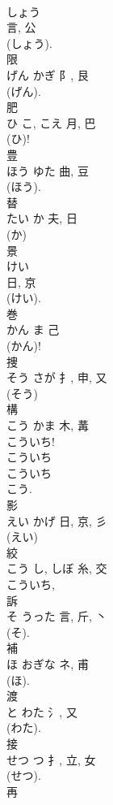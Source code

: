 \documentclass[8pt]{extreport}
\begin{document}
\begin{CJK}{UTF8}{min}
\\	しょう	
\\	言, 公	
\\	(しょう). 
\\	限	
\\	げん	かぎ	阝, 艮	
\\	(げん). 
\\	肥	
\\	ひ	こ, こえ	月, 巴	
\\	(ひ)! 
\\	豊	
\\	ほう	ゆた	曲, 豆	
\\	(ほう). 
\\	替	
\\	たい	か	夫, 日	
\\	(か) 
\\	景	
\\	けい	
\\	日, 京	
\\	(けい). 
\\	巻	
\\	かん	ま	己		
\\	(かん)! 
\\	捜	
\\	そう	さが	扌, 申, 又	
\\	(そう) 
\\	構	
\\	こう	かま	木, 冓	
\\	こういち! 
\\	こういち 
\\	こういち 
\\	こう.
\\	影	
\\	えい	かげ	日, 京, 彡	
\\	(えい) 
\\	絞	
\\	こう	し, しぼ	糸, 交	
\\	こういち, 
\\	訴	
\\	そ	うった	言, 斤, 丶	
\\	(そ). 
\\	補	
\\	ほ	おぎな	ネ, 甫	
\\	(ほ). 
\\	渡	
\\	と	わた	氵, 又		
\\	(わた). 
\\	接	
\\	せつ	つ	扌, 立, 女	
\\	(せつ). 
\\	再	

\end{CJK}
\end{document}
